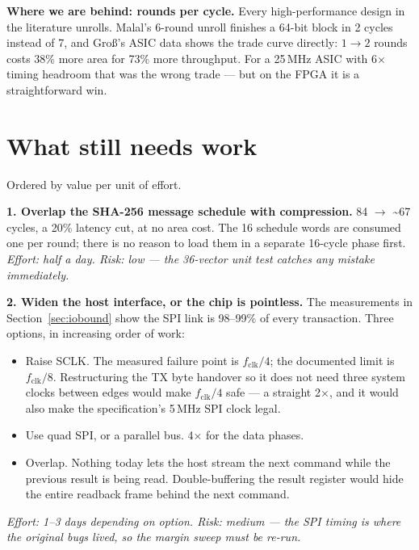 \documentclass[11pt,a4paper]{article}
\begin{document}
\textbf{Where we are behind: rounds per cycle.} Every high-performance design
in the literature unrolls. Malal's 6-round unroll \cite{asconvhdl} finishes a
64-bit block in 2 cycles instead of 7, and Gro\ss{}'s ASIC data shows the trade
curve directly: $1 \to 2$ rounds costs 38\% more area for 73\% more throughput.
For a 25\,MHz ASIC with 6$\times$ timing headroom that was the wrong trade ---
but on the FPGA it is a straightforward win.

\section{What still needs work}\label{sec:next}

Ordered by value per unit of effort.

\textbf{1. Overlap the SHA-256 message schedule with compression.}
84 $\to$ \textasciitilde 67 cycles, a 20\% latency cut, at no area cost. The
16 schedule words are consumed one per round; there is no reason to load them
in a separate 16-cycle phase first. \emph{Effort: half a day. Risk: low --- the
36-vector unit test catches any mistake immediately.}

\textbf{2. Widen the host interface, or the chip is pointless.} The
measurements in Section~\ref{sec:iobound} show the SPI link is 98--99\% of
every transaction. Three options, in increasing order of work:
\begin{itemize}[nosep,leftmargin=1.4em]
\item Raise SCLK. The measured failure point is $f_{\mathrm{clk}}/4$; the
      documented limit is $f_{\mathrm{clk}}/8$. Restructuring the TX byte
      handover so it does not need three system clocks between edges would make
      $f_{\mathrm{clk}}/4$ safe --- a straight 2$\times$, and it would also make
      the specification's 5\,MHz SPI clock legal.
\item Use quad SPI, or a parallel bus. 4$\times$ for the data phases.
\item Overlap. Nothing today lets the host stream the next command while the
      previous result is being read. Double-buffering the result register would
      hide the entire readback frame behind the next command.
\end{itemize}
\emph{Effort: 1--3 days depending on option. Risk: medium --- the SPI timing is
where the original bugs lived, so the margin sweep must be re-run.}
\end{document}
